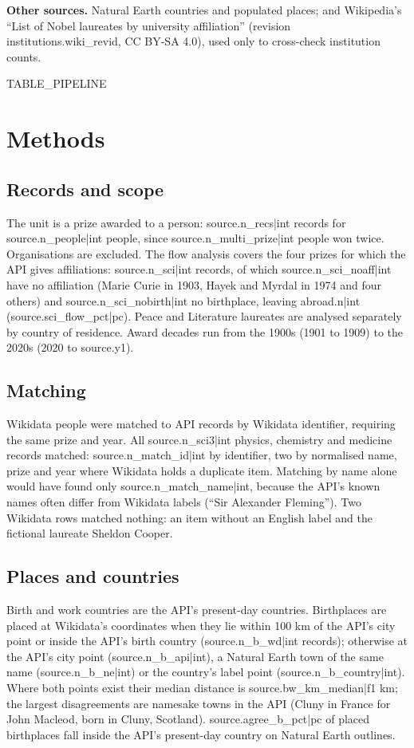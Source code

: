 \documentclass[11pt,a4paper]{article}
\begin{document}
\textbf{Other sources.} Natural Earth \citep{naturalearth} countries and populated places; and Wikipedia's ``List of Nobel laureates by university affiliation'' (revision {{institutions.wiki_revid}}, CC BY-SA 4.0), used only to cross-check institution counts.

{{TABLE_PIPELINE}}

\section{Methods}
\subsection{Records and scope}
The unit is a prize awarded to a person: {{source.n_recs|int}} records for {{source.n_people|int}} people, since {{source.n_multi_prize|int}} people won twice. Organisations are excluded. The flow analysis covers the four prizes for which the API gives affiliations: {{source.n_sci|int}} records, of which {{source.n_sci_noaff|int}} have no affiliation (Marie Curie in 1903, Hayek and Myrdal in 1974 and four others) and {{source.n_sci_nobirth|int}} no birthplace, leaving {{abroad.n|int}} ({{source.sci_flow_pct|pc}}). Peace and Literature laureates are analysed separately by country of residence. Award decades run from the 1900s (1901 to 1909) to the 2020s (2020 to {{source.y1}}).

\subsection{Matching}
Wikidata people were matched to API records by Wikidata identifier, requiring the same prize and year. All {{source.n_sci3|int}} physics, chemistry and medicine records matched: {{source.n_match_id|int}} by identifier, two by normalised name, prize and year where Wikidata holds a duplicate item. Matching by name alone would have found only {{source.n_match_name|int}}, because the API's known names often differ from Wikidata labels (``Sir Alexander Fleming''). Two Wikidata rows matched nothing: an item without an English label and the fictional laureate Sheldon Cooper.

\subsection{Places and countries}
Birth and work countries are the API's present-day countries. Birthplaces are placed at Wikidata's coordinates when they lie within 100 km of the API's city point or inside the API's birth country ({{source.n_b_wd|int}} records); otherwise at the API's city point ({{source.n_b_api|int}}), a Natural Earth town of the same name ({{source.n_b_ne|int}}) or the country's label point ({{source.n_b_country|int}}). Where both points exist their median distance is {{source.bw_km_median|f1}} km; the largest disagreements are namesake towns in the API (Cluny in France for John Macleod, born in Cluny, Scotland). {{source.agree_b_pct|pc}} of placed birthplaces fall inside the API's present-day country on Natural Earth outlines.
\end{document}
